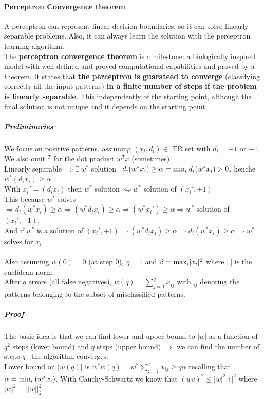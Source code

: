 \documentclass[10pt]{report}
\begin{document}
\paragraph{Perceptron Convergence theorem} A perceptron can represent linear decision boundaries, so it can solve linearly separable problems. Also, it can always learn the solution with the perceptron learning algorithm.\\
The \textbf{perceptron convergence theorem} is a milestone: a biologically inspired model with well-defined and proved computational capabilities and proved by a theorem. It states that \textbf{the perceptron is guarateed to converge} (classifying correctly all the input patterns) \textbf{in a finite number of steps if the problem is linearly separable}. This independently of the starting point, although the final solution is not unique and it depends on the starting point.
\subparagraph{Preliminaries} We focus on positive patterns, assuming $(x_i, d_i)\in$ TR set with $d_i = +1$ or $-1$. We also omit $^T$ for the dot product $w^T x$ (sometimes).\\
Linearly separable $\Rightarrow\exists\: w^*$ solution $|\:d_i(w^* x_i)\geq \alpha = \hbox{min}_i\:d_i(w^*x_i) > 0$, henche $w^*(d_ix_i)\geq \alpha$.\\
With $x_i' = (d_ix_i)$ then $w^*$ solution $\Leftrightarrow w^*$ solution of $(x_i', +1)$\\
This because $w^*$ solves $\Rightarrow d_i(w^*x_i) \geq \alpha \Rightarrow (w^*d_ix_i)\geq\alpha\Rightarrow (w^*x_i')\geq\alpha \Rightarrow w^*$ solution of $(x_i', +1)$.\\
And if $w^*$ is a solution of $(x_i', +1)\Rightarrow(w^*d_ix_i)\geq \alpha\Rightarrow d_i(w^*x_i)\geq \alpha\Rightarrow w^*$ solves for $x_i$\\\\
Also assuming $w(0) = 0$ (at step $0$), $\eta = 1$ and $\beta = \hbox{max}_i |x_i|^2$ where $|\:|$ is the euclidean norm.\\
After $q$ errors (all false negatives), $w(q) = \sum_{j=1}^q x_{ij}$ with $_{ij}$ denoting the patterns belonging to the subset of misclassified patterns.
\subparagraph{Proof} The basic idea is that we can find lower and upper bound to $|w|$ as a function of $q^2$ steps (lower bound) and $q$ steps (upper bound) $\Rightarrow$ we can find the number of steps $q\:|$ the algorithm converges.\\
Lower bound on $|w(q)|$ is $w^* w(q) = w^*\sum_{j=1}^q x_{ij}\geq q\alpha$ recalling that $\alpha=\hbox{min}_i\:(w^*x_i)$. With Cauchy-Schwartz we know that $(wv)^2 \leq |w|^2|v|^2$ where $|w|^2 = ||w||_2 ^2$.\\
\end{document}

